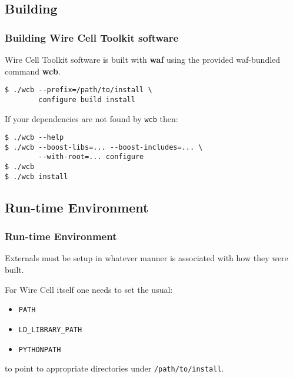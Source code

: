 \documentclass[xcolor=dvipsnames]{beamer}
\begin{document}
\subsection{Building}

\begin{frame}[fragile]
  \frametitle{Building Wire Cell Toolkit software}
  
  Wire Cell Toolkit software is built with \textbf{waf} using the
  provided waf-bundled command \textbf{wcb}.

\begin{verbatim}
$ ./wcb --prefix=/path/to/install \
        configure build install
\end{verbatim}

If your dependencies are not found by \texttt{wcb} then:

\begin{verbatim}
$ ./wcb --help
$ ./wcb --boost-libs=... --boost-includes=... \
        --with-root=... configure
$ ./wcb
$ ./wcb install
\end{verbatim}

\end{frame}

\subsection{Run-time Environment}

\begin{frame}[fragile]
  \frametitle{Run-time Environment}

  Externals must be setup in whatever manner is associated with how they were built.

  For Wire Cell itself one needs to set the usual:

  \begin{itemize}
  \item \verb|PATH|
  \item \verb|LD_LIBRARY_PATH|
  \item \verb|PYTHONPATH|
  \end{itemize}

  to point to appropriate directories under \verb|/path/to/install|.

\end{frame}
\end{document}
